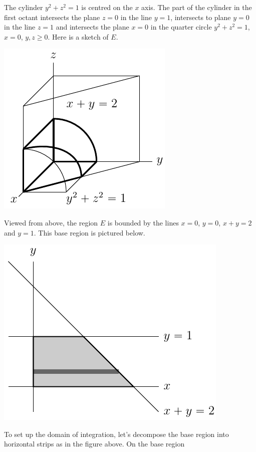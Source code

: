 \begin{solution}
The cylinder $y^2+z^2=1$ is centred on the $x$ axis. The part of the cylinder
in the first octant intersects the plane $z=0$ in the line $y= 1$,
intersects to plane $y=0$ in the line $z=1$ and intersects the plane
$x=0$ in the quarter circle $y^2+z^2=1$, $x=0$, $y,z\ge 0$. Here is a
sketch of $E$.
\begin{center}
     \includegraphics{fig/OE02DQ8b.pdf}
\end{center}
Viewed from above, the region
$E$ is bounded by the lines $x=0$, $y=0$, $x+y=2$ and $y=1$. This base region
is pictured below.
\begin{center}
     \includegraphics{fig/OE02DQ8.pdf}
\end{center}
To set up the domain of integration, let's decompose the base region into
horizontal strips as in the figure above. On the base region
\begin{itemize}

\end{itemize}
\end{solution}
